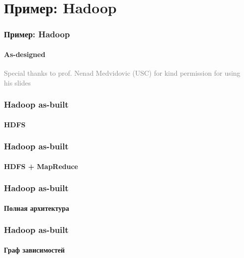 \documentclass{../cscslides}
\begin{document}
    \section{Пример: Hadoop}

    \begin{frame}
        \frametitle{Пример: Hadoop}
        \framesubtitle{As-designed}
        \begin{scriptsize}\textcolor{gray}{Special thanks to prof. Nenad Medvidovic (USC) for kind permission for using his slides}\end{scriptsize}
    \end{frame}

    \begin{frame}
        \frametitle{Hadoop as-built}
        \framesubtitle{HDFS}
    \end{frame}

    \begin{frame}
        \frametitle{Hadoop as-built}
        \framesubtitle{HDFS + MapReduce}
    \end{frame}

    \begin{frame}
        \frametitle{Hadoop as-built}
        \framesubtitle{Полная архитектура}
    \end{frame}

    \begin{frame}
        \frametitle{Hadoop as-built}
        \framesubtitle{Граф зависимостей}
    \end{frame}
\end{document}

